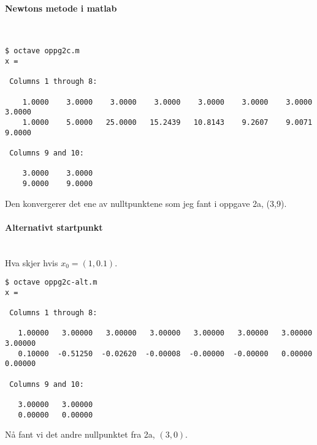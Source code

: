 \paragraph{Newtons metode i matlab} \mbox{} \\

\begin{lstlisting}[caption=Output]
$ octave oppg2c.m
x =

 Columns 1 through 8:

    1.0000    3.0000    3.0000    3.0000    3.0000    3.0000    3.0000    3.0000
    1.0000    5.0000   25.0000   15.2439   10.8143    9.2607    9.0071    9.0000

 Columns 9 and 10:

    3.0000    3.0000
    9.0000    9.0000
\end{lstlisting}

Den konvergerer det ene av nulltpunktene som jeg fant i oppgave 2a, (3,9).



\paragraph{Alternativt startpunkt} \mbox{} \\
Hva skjer hvis $x_0 = (1,0.1)$.

\begin{lstlisting}[caption=Output]
$ octave oppg2c-alt.m
x =

 Columns 1 through 8:

   1.00000   3.00000   3.00000   3.00000   3.00000   3.00000   3.00000   3.00000
   0.10000  -0.51250  -0.02620  -0.00008  -0.00000  -0.00000   0.00000   0.00000

 Columns 9 and 10:

   3.00000   3.00000
   0.00000   0.00000
\end{lstlisting}

Nå fant vi det andre nullpunktet fra 2a, $(3,0)$.
